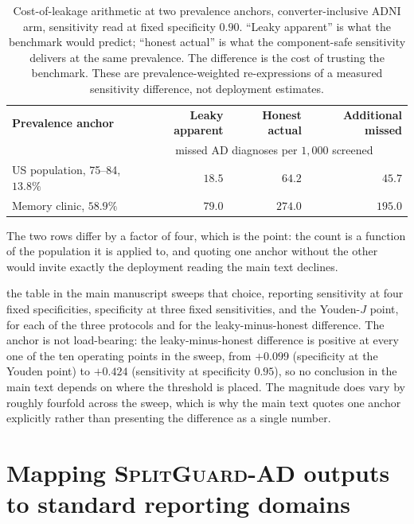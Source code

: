 \documentclass[11pt]{article}
\newcommand{\SGA}{\textsc{SplitGuard-AD}}
\begin{document}
\begin{table}[!ht]
\centering
\small
\caption{Cost-of-leakage arithmetic at two prevalence anchors, converter-inclusive
ADNI arm, sensitivity read at fixed specificity $0.90$. ``Leaky apparent'' is
what the benchmark would predict; ``honest actual'' is what the
component-safe sensitivity delivers at the same prevalence. The difference is
the cost of trusting the benchmark. These are prevalence-weighted
re-expressions of a measured sensitivity difference, not deployment
estimates.}
\label{tab:sm_cost_of_leakage}
\begin{tabular}{@{}lrrr@{}}
\toprule
\textbf{Prevalence anchor} & \textbf{Leaky apparent} & \textbf{Honest actual}
 & \textbf{Additional missed} \\
 & \multicolumn{3}{c}{missed AD diagnoses per $1{,}000$ screened} \\
\midrule
US population, 75--84, $13.8\%$~\cite{rajan2021} & $18.5$ & $64.2$ & $45.7$ \\
Memory clinic, $58.9\%$~\cite{thomas2024prompt}  & $79.0$ & $274.0$ & $195.0$ \\
\bottomrule
\end{tabular}
\end{table}

\noindent
The two rows differ by a factor of four, which is the point: the count is a
function of the population it is applied to, and quoting one anchor without
the other would invite exactly the deployment reading the main text declines.

the table in the main manuscript sweeps that choice,
reporting sensitivity at four fixed specificities, specificity at three fixed
sensitivities, and the Youden-$J$ point, for each of the three protocols and
for the leaky-minus-honest difference. The anchor is not load-bearing: the
leaky-minus-honest difference is positive at every one of the ten operating
points in the sweep, from $+0.099$ (specificity at the Youden point) to
$+0.424$ (sensitivity at specificity $0.95$), so no conclusion in the main text
depends on where the threshold is placed. The magnitude does vary by roughly
fourfold across the sweep, which is why the main text quotes one anchor
explicitly rather than presenting the difference as a single number.



\section{Mapping \SGA{} outputs to standard reporting domains}
\label{sm:tripod_map}
\end{document}
